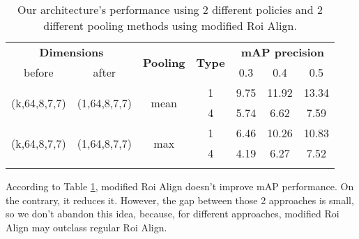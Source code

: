 \begin{center}
\begin{longtable}{||c | c | c| c||c c c||}

  \hline
  \multicolumn{2}{||c|}{\textbf{Dimensions}} & \multirow{2}{*}{ \textbf{Pooling}} &\multirow{2}{*}{\textbf{Type}} & \multicolumn{3}{|c||}{\textbf{mAP precision}}\\

   before & after &  {} & {} &  0.3 &  0.4 & 0.5 \\
 \hline   \hline
 \multirow{2}{*}{(k,64,8,7,7)} & \multirow{2}{*}{(1,64,8,7,7)} & \multirow{2}{*}{mean}  & 1 & 9.75 & 11.92 & 13.34 \\
  \cline{4-7}
  {} & {} & {} & 4 &  5.74 &6.62 & 7.59 \\
  \hline
 \multirow{2}{*}{(k,64,8,7,7)} & \multirow{2}{*}{(1,64,8,7,7)} & \multirow{2}{*}{max}  & 1 &  6.46 & 10.26 & 10.83 \\
    \cline{4-7}
  {} & {} & {} & 4 & 4.19 & 6.27 & 7.52 \\
    \cline{4-7}
  \hline
  \caption{Our architecture's performance using 2 different policies and 2 different pooling methods using modified Roi Align.}
  \label{table:svm_mod_roialign}

\end{longtable} 
\end{center}

According to Table \ref{table:svm_mod_roialign}, modified Roi Align doesn't improve mAP performance. On the contrary, it reduces it.
However, the gap between those 2 approaches is small, so we don't abandon this idea, because, for different approaches,
modified Roi Align may outclass regular Roi Align.


